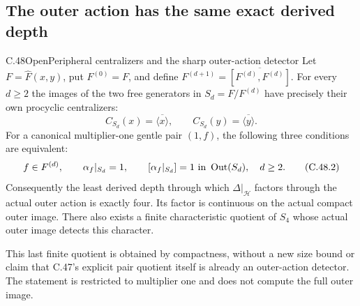 \subsection{The outer action has the same exact derived depth}

\begin{statement}{C.48}{Open}{Peripheral centralizers and the sharp outer-action detector}
Let $F=\widehat F(x,y)$, put $F^{(0)}=F$, and define
$F^{(d+1)}=\overline{[F^{(d)},F^{(d)}]}$.
For every $d\geq2$ the images of the two free generators in
$S_d=F/F^{(d)}$ have precisely their own procyclic centralizers:
\[
 C_{S_d}(x)=\overline{\langle x\rangle},\qquad
 C_{S_d}(y)=\overline{\langle y\rangle}.                 \tag{C.48.1}
\]
For a canonical multiplier-one gentle pair $(1,f)$, the following
three conditions are equivalent:
\[
 f\in F^{(d)},\qquad
 \alpha_f|_{S_d}=1,\qquad
 [\alpha_f|_{S_d}]=1\ \hbox{in }\operatorname{Out}(S_d),
 \quad d\geq2.                                       \tag{C.48.2}
\]
Consequently the least derived depth through which
$\Delta|_{\mathcal H}$ factors through the actual outer action is
exactly four. Its factor is continuous on the actual compact outer
image. There also exists a finite characteristic quotient of
$S_4$ whose actual outer image detects this character.

This last finite quotient is obtained by compactness, without a
new size bound or claim that C.47's explicit pair quotient itself
is already an outer-action detector. The statement is restricted
to multiplier one and does not compute the full outer image.
\end{statement}


